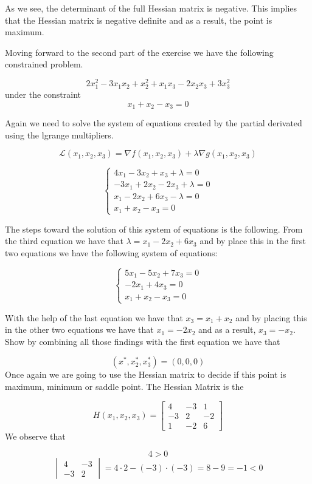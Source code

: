 \documentclass[
]{article}
\begin{document}
As we see, the determinant of the full Hessian matrix is negative. This
implies that the Hessian matrix is negative definite and as a result,
the point is maximum.

Moving forward to the second part of the exercise we have the following
constrained problem.

\[
2x_1^2 − 3x_1x_2 + x_2^2 +x_1x_3 − 2x_2x_3 +3x_3^2
\] under the constraint \[
x_1 +x_2 −x_3 =0
\]

Again we need to solve the system of equations created by the partial
derivated using the lgrange multipliers.

\[
\mathcal{L}(x_1,x_2,x_3) = \nabla f(x_1,x_2,x_3) + \lambda \nabla g(x_1,x_2,x_3)
\]

\[
\begin{cases}
4x_1 - 3x_2 + x_3 + \lambda = 0 \\
-3x_1 + 2x_2-2x_3 + \lambda = 0 \\
x_1 - 2x_2 + 6x_3 - \lambda = 0 \\
x_1 + x_2 - x_3 = 0
\end{cases}
\]

The steps toward the solution of this system of equations is the
following. From the third equation we have that
\(\lambda = x_1-2x_2+6x_3\) and by place this in the first two equations
we have the following system of equations:

\[
\begin{cases}
5x_1-5x_2+7x_3=0 \\
-2x_1+4x_3=0 \\
x_1 + x_2 - x_3 = 0
\end{cases}
\]

With the help of the last equation we have that \(x_3 = x_1 + x_2\) and
by placing this in the other two equations we have that \(x_1 = -2x_2\)
and as a result, \(x_3 = -x_2\). Show by combining all those findings
with the first equation we have that

\[
(x^*,x_2^*,x_3^*) = (0,0,0)
\] Once again we are going to use the Hessian matrix to decide if this
point is maximum, minimum or saddle point. The Hessian Matrix is the

\[
H(x_1,x_2,x_3)=\begin{bmatrix}
4 & -3 & 1 \\
-3 & 2 & -2 \\
1 & -2 & 6 
\end{bmatrix}
\] We observe that

\[
4>0
\] \[
\begin{vmatrix}
4 & -3 \\
-3 & 2
\end{vmatrix} = 4\cdot2 - (-3)\cdot(-3)= 8 - 9 = -1 <0
\]
\end{document}
